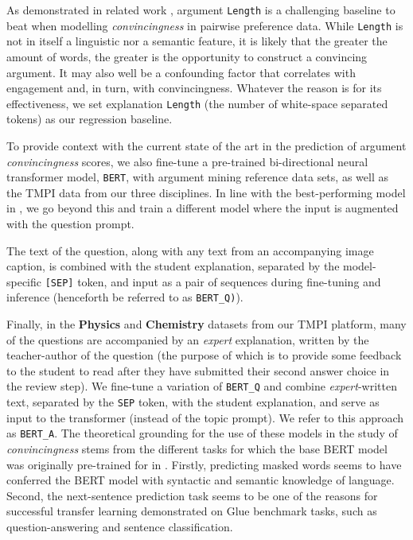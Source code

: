 \documentclass[notitlepage,12pt]{jedm}
\begin{document}
As demonstrated in related work \cite{habernal_which_2016}, argument 
\verb|Length| is a challenging baseline to beat when modelling 
\textit{convincingness} in pairwise preference data.
While \verb|Length| is not in itself a linguistic nor a
semantic feature, it is likely that
the greater the amount of words, the greater is the opportunity to construct a 
convincing argument. It may also well be a confounding factor that correlates with engagement and, in turn, with convincingness.  Whatever the reason is for its effectiveness, we set explanation \verb|Length| (the number 
of white-space separated tokens) as our regression baseline. 

To provide context with the current state of the art in the prediction of 
argument \textit{convincingness} scores, we also fine-tune a pre-trained 
bi-directional neural transformer model, \verb|BERT|, with argument mining 
reference data sets, as well as the TMPI data from our three disciplines. 
In line with the best-performing model in , we go 
beyond this and train a different model where the input is augmented with the 
question prompt. 

The text of the question, along with any text from an accompanying image 
caption, is combined with the student explanation, separated by the 
model-specific \verb|[SEP]| token, and input as a pair of sequences during 
fine-tuning and inference (henceforth be referred to as \verb|BERT_Q)|).

Finally, in the \textbf{Physics} and \textbf{Chemistry} datasets from our TMPI 
platform, many of the questions are accompanied by an \textit{expert} 
explanation, written by the teacher-author of the question (the purpose of 
which is to provide some feedback to the student to read after they have 
submitted their second answer choice in the review step).
We fine-tune a variation of \verb|BERT_Q| and combine \textit{expert}-written 
text, separated by the \verb|SEP| token, with the student explanation, and 
serve as input to the transformer (instead of the topic prompt).
We refer to this approach as \verb|BERT_A|.
The theoretical grounding for the use of these models in the study of 
\textit{convincingness} stems from the different tasks for which the base BERT 
model was originally pre-trained for in .
Firstly, predicting masked words seems to have conferred the BERT 
model with syntactic and semantic knowledge of language.
Second, the next-sentence prediction task seems to be one of the reasons for 
successful transfer learning demonstrated on Glue benchmark tasks, such 
as question-answering and sentence classification. 
\end{document}

